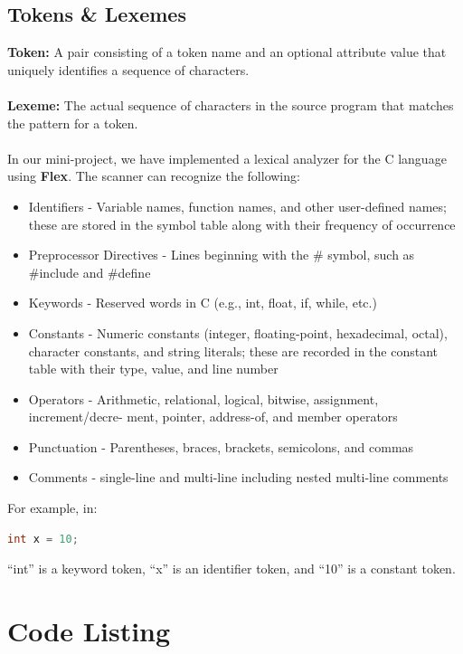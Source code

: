 \documentclass[12pt,a4paper]{article}
\begin{document}
\subsection{Tokens \& Lexemes}
\textbf{Token:} A pair consisting of a token name and an optional attribute value that uniquely identifies a sequence of characters.\\
\\
\textbf{Lexeme:} The actual sequence of characters in the source program that matches the pattern for a token.\\
\\
In our mini-project, we have implemented a lexical analyzer for the C language using \textbf{Flex}. The scanner can recognize the following:
\begin{itemize}
    \item Identifiers - Variable names, function names, and other user-defined names;
    these are stored in the symbol table along with their frequency of occurrence
    \item Preprocessor Directives - Lines beginning with the \# symbol, such as \#include
    and \#define
    \item Keywords - Reserved words in C (e.g., int, float, if, while, etc.)
    \item Constants - Numeric constants (integer, floating-point, hexadecimal, octal),
    character constants, and string literals; these are recorded in the constant table
    with their type, value, and line number
    \item Operators - Arithmetic, relational, logical, bitwise, assignment, increment/decre-
    ment, pointer, address-of, and member operators
    \item Punctuation - Parentheses, braces, brackets, semicolons, and commas
    \item Comments - single-line and multi-line including nested multi-line comments
\end{itemize}
For example, in:
\begin{lstlisting}[language=C]
int x = 10;
\end{lstlisting}
``int'' is a keyword token, ``x'' is an identifier token, and ``10'' is a constant token. \vspace{0.5cm}

\section{Code Listing}


\end{document}

